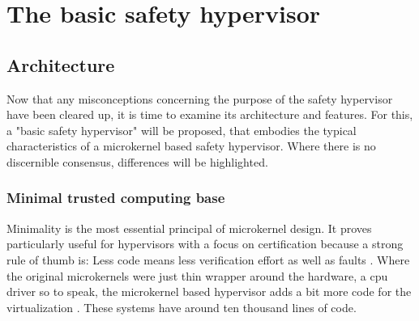 
\chapter{The basic safety hypervisor} %

\label{Chapter2} %





\section{Architecture}
Now that any misconceptions concerning the purpose of the safety hypervisor have been cleared up, it is time to examine its architecture and features. For this, a "basic safety hypervisor" will be proposed, that embodies the typical characteristics of a microkernel based safety hypervisor. Where there is no discernible consensus, differences will be highlighted.

\subsection{Minimal trusted computing base}
Minimality is the most essential principal of microkernel design. It proves particularly useful for hypervisors with a focus on certification because a strong rule of thumb is: Less code means less verification effort as well as faults \cite{Lipow.1982}.  
Where the original microkernels were just thin wrapper around the hardware, a \acrshort{cpu} driver so to speak, the microkernel based hypervisor adds a bit more code for the virtualization \cite{Heiser.2010}. These systems have around ten thousand lines of code.

